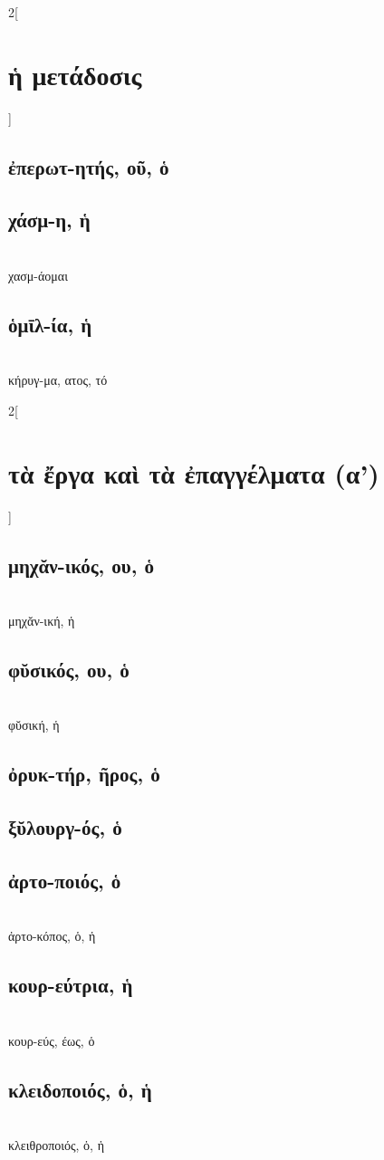 \documentclass{book}
\begin{document}
\begin{multicols}{2}[\section{ἡ μετάδοσις}]
\subsection{ἐπερωτ-ητής, οῦ, ὁ}
\subsection{χάσμ-η, ἡ}  ~\\
χασμ-άομαι 
\subsection{ὁμῑλ-ία, ἡ}
 ~\\
κήρυγ-μα, ατος, τό
~
\end{multicols}
\newpage
\begin{multicols}{2}[\section{τὰ ἔργα καὶ τὰ ἐπαγγέλματα (α')}]
\subsection{μηχᾰν-ικός, ου, ὁ}  ~\\
μηχᾰν-ική, ἡ 
\subsection{φῠσικός, ου, ὁ}   ~\\
φῠσική, ἡ 
\subsection{ὀρυκ-τήρ, ῆρος, ὁ}
\subsection{ξῠλουργ-ός, ὁ}
\subsection{ἀρτο-ποιός, ὁ}  ~\\
ἀρτο-κόπος, ὁ, ἡ 
\subsection{κουρ-εύτρια, ἡ}  ~\\
κουρ-εύς, έως, ὁ  
\subsection{κλειδοποιός, ὁ, ἡ}  ~\\
κλειθροποιός, ὁ, ἡ 
~
\end{multicols}
\end{document}
